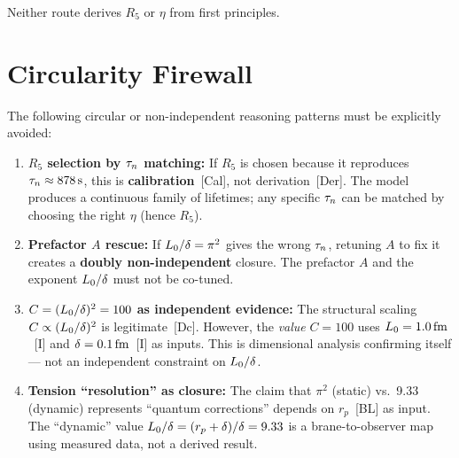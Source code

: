 Neither route derives $R_5$ or $\eta$ from first principles.

\section{Circularity Firewall}
\label{sec:L0d:circularity}

\begin{quarantinebox}[title=Circularity Safeguards]
The following circular or non-independent reasoning patterns must be explicitly
avoided:

\begin{enumerate}
    \item \textbf{$R_5$ selection by $\tau_n$ matching:} If $R_5$ is chosen because
          it reproduces $\tau_n \approx 878\,\mathrm{s}$, this is \textbf{calibration}~[Cal],
          not derivation~[Der]. The model produces a continuous family of lifetimes;
          any specific $\tau_n$ can be matched by choosing the right $\eta$ (hence $R_5$).

    \item \textbf{Prefactor $A$ rescue:} If $L_0/\delta = \pi^2$ gives the
          wrong $\tau_n$, retuning $A$ to fix it creates a \textbf{doubly
          non-independent} closure. The prefactor $A$ and the exponent
          $L_0/\delta$ must not be co-tuned.

    \item \textbf{$C = (L_0/\delta)^2 = 100$ as independent evidence:}
          The structural scaling $C \propto (L_0/\delta)^2$ is legitimate~[Dc].
          However, the \emph{value} $C = 100$ uses $L_0 = 1.0\,\mathrm{fm}$~[I] and
          $\delta = 0.1\,\mathrm{fm}$~[I] as inputs. This is dimensional analysis confirming
          itself --- not an independent constraint on $L_0/\delta$.

    \item \textbf{Tension ``resolution'' as closure:} The claim that $\pi^2$
          (static) vs.\ 9.33 (dynamic) represents ``quantum corrections'' depends
          on $r_p$~[BL] as input. The ``dynamic'' value $L_0/\delta = (r_p +
          \delta)/\delta = 9.33$ is a brane-to-observer map using measured data,
          not a derived result.
\end{enumerate}
\end{quarantinebox}

